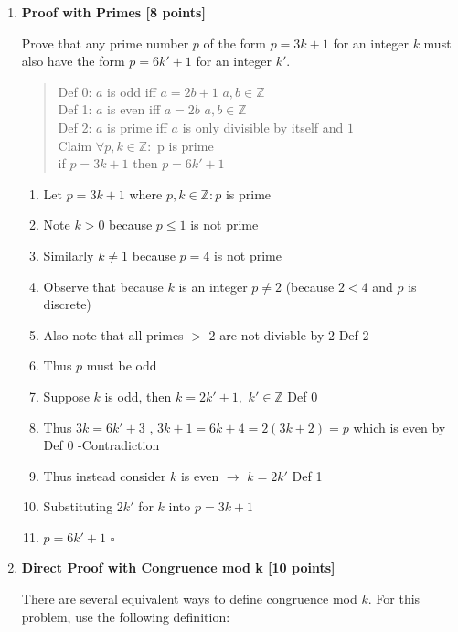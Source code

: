 \documentclass[12pt]{article}
\begin{document}
\begin{enumerate}
\begin{enumerate}[(a)]
\end{enumerate}

\newpage
\item \textbf{Proof with Primes [8 points]}

Prove that any prime number $p$ of the form $p=3k+1$ for an integer $k$
must also have the form $p=6k'+1$ for an integer $k'$.


\begin{quote}
Def 0: $a$ is odd iff $a=2b+1$ $a,b\in\mathbb{Z}$\\
Def 1: $a$ is even iff $a=2b$   $a,b\in\mathbb{Z}$\\
Def 2: $a$ is prime iff $a$ is only divisible by itself and $1$\\
Claim $\forall p,k \in \mathbb{Z} :$ p is prime\\
if $p=3k+1 $ then $p = 6k'+1 $
\end{quote}

\begin{enumerate}
\item Let $p = 3k+1$ where $p,k\in\mathbb{Z}: p$ is prime
\item Note $k > 0$ because $p \leq 1$ is not prime
\item Similarly $k \neq 1$ because $p=4$ is not prime
\item Observe that because $k$ is an integer $p\neq2$ (because $2<4$ and $p$ is discrete)
\item Also note that all primes $>$ $2$ are not divisble by $2$ Def $2$
\item Thus $p$ must be odd
\item Suppose $k$ is odd, then $k=2k'+1,$  $k'\in\mathbb{Z}$ Def $0$
\item Thus $3k=6k'+3$ , $3k+1=6k+4=2(3k+2) = p$ which is even by Def 0 -Contradiction
\item Thus instead consider $k$ is even $\rightarrow$ $k=2k'$ Def 1
\item Substituting $2k'$ for $k$ into $p=3k+1$
\item $p=6k'+1$ $\square$
\end{enumerate}
\newpage
\item \textbf{Direct Proof with Congruence mod k [10 points]}

There are several equivalent ways to define congruence mod $k$.
For this problem, use the following definition:


\end{enumerate}
\end{document}
